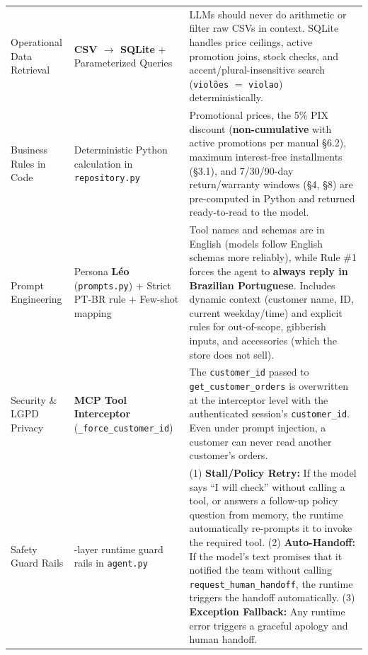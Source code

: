 \documentclass[11pt,a4paper]{article}
\begin{document}
\begin{longtable}{>{\bfseries\raggedright\arraybackslash}p{2.9cm} >{\raggedright\arraybackslash}p{3.6cm} >{\raggedright\arraybackslash}p{9.1cm}}
\addlinespace
Operational Data Retrieval & \textbf{CSV $\rightarrow$ SQLite} + Parameterized Queries & LLMs should never do arithmetic or filter raw CSVs in context. SQLite handles price ceilings, active promotion joins, stock checks, and accent/plural-insensitive search (\texttt{viol\~oes} $=$ \texttt{violao}) deterministically. \\
\addlinespace
Business Rules in Code & Deterministic Python calculation in \texttt{repository.py} & Promotional prices, the 5\% PIX discount (\textbf{non-cumulative} with active promotions per manual \S6.2), maximum interest-free installments (\S3.1), and 7/30/90-day return/warranty windows (\S4, \S8) are pre-computed in Python and returned ready-to-read to the model. \\
\addlinespace
Prompt Engineering & Persona \textbf{L\'eo} (\texttt{prompts.py}) + Strict PT-BR rule + Few-shot mapping & Tool names and schemas are in English (models follow English schemas more reliably), while Rule \#1 forces the agent to \textbf{always reply in Brazilian Portuguese}. Includes dynamic context (customer name, ID, current weekday/time) and explicit rules for out-of-scope, gibberish inputs, and accessories (which the store does not sell). \\
\addlinespace
Security \& LGPD Privacy & \textbf{MCP Tool Interceptor} (\texttt{\_force\_customer\_id}) & The \texttt{customer\_id} passed to \texttt{get\_customer\_orders} is overwritten at the interceptor level with the authenticated session's \texttt{customer\_id}. Even under prompt injection, a customer can never read another customer's orders. \\
\addlinespace
Safety Guard Rails & 3-layer runtime guard rails in \texttt{agent.py} & (1) \textbf{Stall/Policy Retry:} If the model says ``I will check'' without calling a tool, or answers a follow-up policy question from memory, the runtime automatically re-prompts it to invoke the required tool. (2) \textbf{Auto-Handoff:} If the model's text promises that it notified the team without calling \texttt{request\_human\_handoff}, the runtime triggers the handoff automatically. (3) \textbf{Exception Fallback:} Any runtime error triggers a graceful apology and human handoff. \\
\bottomrule
\end{longtable}
\endgroup
\end{document}
